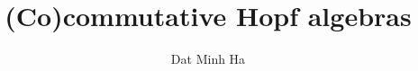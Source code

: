 

\setcounter{section}{-1}





    \title{(Co)commutative Hopf algebras}
    
    \author{Dat Minh Ha}
    \maketitle
    
    \begin{abstract}
    
    \end{abstract}
    
    {
    \hypersetup{} 
    \tableofcontents %
    }

    \listoftodos

    

    

    

    \begin{appendices}
        

        
    \end{appendices}
    
    \printbibliography

